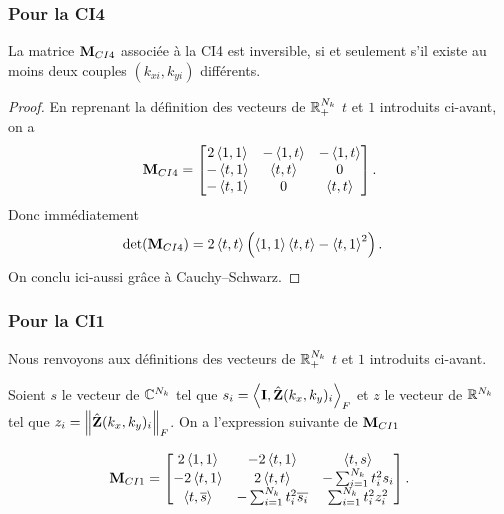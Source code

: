     \subsubsection{Pour la CI4}

      \begin{prop}
        La matrice \({\mathbf{M}}_{CI4}\)
        associée à la CI4 est inversible, si et seulement s'il existe au moins deux couples \((k_{xi},k_{yi})\) différents.
      \end{prop}

      \begin{proof}
        En reprenant la définition des vecteurs de \(\mathbb R_+^{N_{k}}\) \(t\) et \(1\) introduits ci-avant, on a
        \begin{equation*}
          {\mathbf{M}}_{CI4} = \begin{bmatrix}
          2\left<{1},{1}\right> & -\left<{1},{t}\right> & -\left<{1},{t}\right>
          \\
          -\left<{t},{1}\right> & \left<{t},{t}\right>  & 0
          \\
          -\left<{t},{1}\right> & 0          & \left<{t},{t}\right>
          \end{bmatrix}.
        \end{equation*}
        Donc immédiatement
        \begin{align*}
          \det({\mathbf{M}}_{CI4}) &= 2\left<{t},{t}\right>\left( \left<{1},{1}\right>\left<{t},{t}\right> - \left<{t},{1}\right>^2\right).
        \end{align*}
        On conclu ici-aussi grâce à Cauchy–Schwarz.
      \end{proof}

      \subsubsection{Pour la CI1}

      Nous renvoyons aux définitions des vecteurs de \(\mathbb R_+^{N_{k}}\) \(t\) et \(1\) introduits ci-avant.

      Soient \(s\) le vecteur de \(\mathbb C^{N_{k}}\) tel que \(s_i = \left<{\mathbf{I}},{\hat{\mathbf{Z}}(k_{x},k_{y})_i}\right>_F\) et \(z\) le vecteur de \(\mathbb R^{N_{k}}\) tel que \(z_i = \left\lVert\hat{\mathbf{Z}}(k_{x},k_{y})_i\right\rVert_F\). On a l'expression suivante de \({\mathbf{M}_{CI1}}\)

      \begin{equation*}
        {\mathbf{M}}_{CI1} = \begin{bmatrix}
        2\left<{1},{1}\right>  & -2\left<{t},{1}\right> & \left<{t},{s}\right>
        \\
        -2\left<{t},{1}\right> & 2\left<{t},{t}\right> & -\sum_{i=1}^{N_{k}} t_i^2 s_i
        \\
        \left<{t},{{\overline{s}}}\right> & -\sum_{i=1}^{N_{k}} t_i^2 {\overline{s_i}} & \sum_{i=1}^{N_{k}} t_i^2 z_i^2 
        \end{bmatrix}.
      \end{equation*}
      
